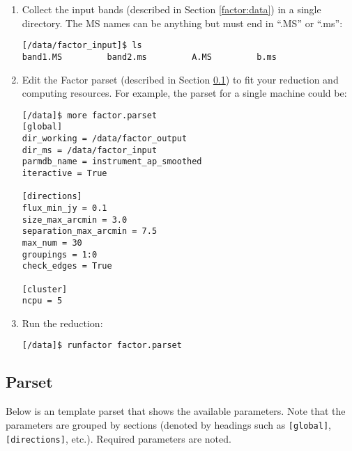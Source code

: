 \documentclass[structabstract]{article}
\begin{document}
\begin{enumerate}
\item Collect the input bands (described in Section \ref{factor:data}) in a
single directory. The MS names can be anything but must end in ``.MS'' or
``.ms'':
\begin{verbatim}
[/data/factor_input]$ ls
band1.MS         band2.ms         A.MS         b.ms
\end{verbatim}
\item Edit the Factor parset (described in Section \ref{factor:parset}) to fit
your reduction and computing resources. For example, the parset for a single
machine could be:
\begin{verbatim}
[/data]$ more factor.parset
[global]
dir_working = /data/factor_output
dir_ms = /data/factor_input
parmdb_name = instrument_ap_smoothed
iteractive = True

[directions]
flux_min_jy = 0.1
size_max_arcmin = 3.0
separation_max_arcmin = 7.5
max_num = 30
groupings = 1:0
check_edges = True

[cluster]
ncpu = 5
\end{verbatim}
\item Run the reduction:
\begin{verbatim}
[/data]$ runfactor factor.parset
\end{verbatim}
\end{enumerate}

\subsection{Parset}
\label{factor:parset}

Below is an template parset that shows the available parameters. Note that the
parameters are grouped by sections (denoted by headings such as {\tt [global]},
{\tt [directions]}, etc.). Required parameters are noted.
\end{document}
